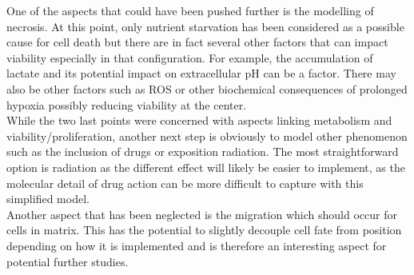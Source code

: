 \documentclass[11pt,a4paper]{article}
\begin{document}
One of the aspects that could have been pushed further is the modelling of necrosis. At this point, only nutrient starvation has been considered as a possible cause for cell death but there are in fact several other factors that can impact viability especially in that configuration. For example, the accumulation of lactate and its potential impact on extracellular pH can be a factor. There may also be other factors such as ROS or other biochemical consequences of prolonged hypoxia possibly reducing viability at the center.\\

While the two last points were concerned with aspects linking metabolism and viability/proliferation, another next step is obviously to model other phenomenon such as the inclusion of drugs or exposition radiation. The most straightforward option is radiation as the different effect will likely be easier to implement, as the molecular detail of drug action can be more difficult to capture with this simplified model.\\

Another aspect that has been neglected is the migration which should occur for cells in matrix. This has the potential to slightly decouple cell fate from position depending on how it is implemented and is therefore an interesting aspect for potential further studies.

\newpage


\end{document}
